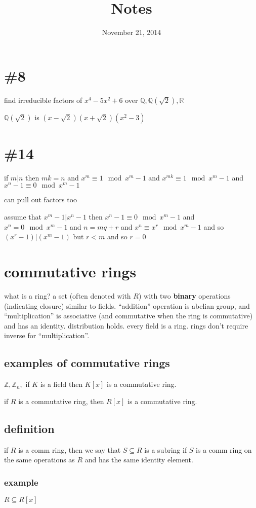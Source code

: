 \documentclass[letterpaper]{article}
\begin{document}
\title{Notes}
\date{November 21, 2014}
\maketitle
\section*{\#8}
find irreducible factors of $x^4-5x^2+6$ over $\mathbb{Q}, \mathbb{Q}(\sqrt{2}),\mathbb{R}$

$\mathbb{Q}(\sqrt{2})$ is $(x-\sqrt{2})(x+\sqrt{2})(x^2-3)$
\section*{\#14}
if $m|n$ then $mk=n$ and $x^m\equiv 1\mod x^m-1$ and $x^{mk}\equiv 1\mod x^m-1$ and $x^n-1\equiv 0\mod x^m-1$

can pull out factors too

assume that $x^m-1|x^n-1$ then $x^n-1\equiv 0\mod x^m-1$ and $x^n=0\mod x^m-1$ and $n=mq+r$ and $x^n\equiv x^r\mod x^m-1$ and so $(x^r-1)|(x^m-1)$ but $r<m$ and so $r=0$

\section*{commutative rings}
what is a ring? a set (often denoted with $R$) with two {\bf binary} operations (indicating closure) similar to fields. ``addition'' operation is abelian group, and ``multiplication'' is associative (and commutative when the ring is commutative) and has an identity. distribution holds. every field is a ring. rings don't require inverse for ``multiplication''.

\subsection*{examples of commutative rings}
$\mathbb{Z},\mathbb{Z}_n,$ if $K$ is a field then $K[x]$ is a commutative ring.

if $R$ is a commutative ring, then $R[x]$ is a commutative ring.

\subsection*{definition}
if $R$ is a comm ring, then we say that $S\subseteq R$ is a subring if $S$ is a comm ring on the same operations as $R$ and has the same identity element.

\subsubsection*{example}
$R\subseteq R[x]$
\end{document}
